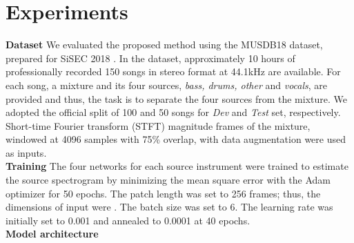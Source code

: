 \documentclass{article}
\begin{document}
\section{Experiments}
\textbf{Dataset} \hspace{1mm}
We evaluated the proposed method using the MUSDB18 dataset, prepared for SiSEC 2018 \cite{sisec2018}. 
In the dataset, approximately 10 hours of professionally recorded 150 songs in stereo format at 44.1kHz are available. For each song, a mixture and its four sources, {\it bass, drums, other} and {\it vocals}, are provided and thus, the task is to separate the four sources from the mixture. We adopted the official split of 100 and 50 songs for {\it Dev} and {\it Test} set, respectively.
Short-time Fourier transform (STFT) magnitude frames of the mixture, windowed at 4096 samples with 75\% overlap, with data augmentation \cite{Uhlich17} were used as inputs. 
\vspace{3mm}\\
\textbf{Training} \hspace{1mm}
The four networks for each source instrument were trained to estimate the source spectrogram by minimizing the mean square error with the Adam optimizer for 50 epochs. The patch length was set to 256 frames; thus, the dimensions of input were . The batch size was set to 6. The learning rate was initially set to 0.001 and annealed to 0.0001 at 40 epochs.
\vspace{3mm}\\
\textbf{Model architecture} \hspace{1mm}
\end{document}
